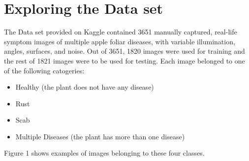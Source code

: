 \documentclass[10pt,twocolumn,letterpaper]{article}
\begin{document}
\section{Exploring the Data set}
The Data set provided on Kaggle contained 3651 manually captured, real-life symptom images of multiple apple foliar  diseases, with variable illumination,  angles,  surfaces,  and  noise. Out of 3651, 1820 images were used for training and the rest of 1821 images were to be used for testing. Each image belonged to one of the following catogeries: 
\begin{itemize}
\item Healthy (the plant does not have any disease)
\item Rust
\item Scab
\item Multiple Diseases (the plant has more than one disease)
\end{itemize}
Figure 1 shows examples of images belonging to these four classes. \cite{kaggle}
\end{document}
